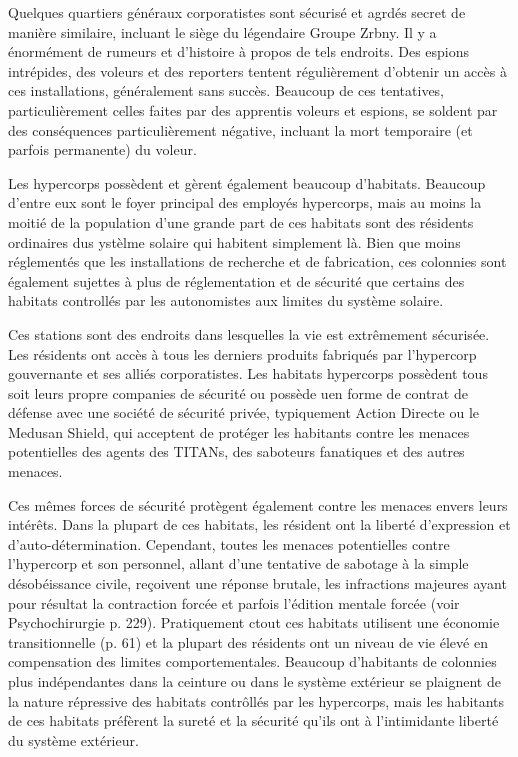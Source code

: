                Quelques quartiers généraux corporatistes sont sécurisé et agrdés secret de manière similaire, incluant le siège du légendaire Groupe Zrbny. Il y a énormément de rumeurs et d'histoire à propos de tels endroits. Des espions intrépides, des voleurs et des reporters tentent régulièrement d'obtenir un accès à ces installations, généralement sans succès. Beaucoup de ces tentatives, particulièrement celles faites par des apprentis voleurs et espions, se soldent par des conséquences particulièrement négative, incluant la mort temporaire (et parfois permanente) du voleur. 

               Les hypercorps possèdent et gèrent également beaucoup d'habitats. Beaucoup d'entre eux sont le foyer principal des employés hypercorps, mais au moins la moitié de la population d'une grande part de ces habitats sont des résidents ordinaires dus ystèlme solaire qui habitent simplement là. Bien que moins réglementés que les installations de recherche et de fabrication, ces colonnies sont également sujettes à plus de réglementation et de sécurité que certains des habitats controllés par les autonomistes aux limites du système solaire. 

               Ces stations sont des endroits dans lesquelles la vie est extrêmement sécurisée. Les résidents ont accès à tous les derniers produits fabriqués par l'hypercorp gouvernante et ses alliés corporatistes. Les habitats hypercorps possèdent tous soit leurs propre companies de sécurité ou possède uen forme de contrat de défense avec une société de sécurité privée, typiquement Action Directe ou le Medusan Shield, qui acceptent de protéger les habitants contre les menaces potentielles des agents des TITANs, des saboteurs fanatiques et des autres menaces. 

               Ces mêmes forces de sécurité protègent également contre les menaces envers leurs intérêts. Dans la plupart de ces habitats, les résident ont la liberté d'expression et d'auto-détermination. Cependant, toutes les menaces potentielles contre l'hypercorp et son personnel, allant d'une tentative de sabotage à la simple désobéissance civile, reçoivent une réponse brutale, les infractions majeures ayant pour résultat la contraction forcée et parfois l'édition mentale forcée (voir Psychochirurgie p. 229). Pratiquement ctout ces habitats utilisent une économie transitionnelle (p. 61) et la plupart des résidents ont un niveau de vie élevé en compensation des limites comportementales. Beaucoup d'habitants de colonnies plus indépendantes dans la ceinture ou dans le système extérieur se plaignent de la nature répressive des habitats contrôllés par les hypercorps, mais les habitants de ces habitats préfèrent la sureté et la sécurité qu'ils ont à l'intimidante liberté du système extérieur. 

